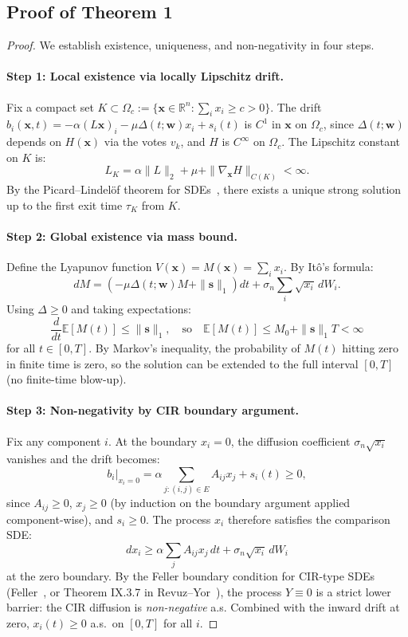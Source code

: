\documentclass[review,12pt]{elsarticle}
\newcommand{\R}{\mathbb{R}}
\newcommand{\bfx}{\mathbf{x}}
\newcommand{\bfw}{\mathbf{w}}
\begin{document}
\subsection{Proof of Theorem 1}

\begin{proof}
We establish existence, uniqueness, and non-negativity in four steps.

\paragraph{Step 1: Local existence via locally Lipschitz drift.}
Fix a compact set $K \subset \Omega_c := \{\bfx \in \R^n : \sum_i x_i \geq c > 0\}$.
The drift $b_i(\bfx, t) = -\alpha(L\bfx)_i - \mu\Delta(t;\bfw)x_i + s_i(t)$
is $C^1$ in $\bfx$ on $\Omega_c$, since $\Delta(t;\bfw)$ depends on
$H(\bfx)$ via the votes $v_k$, and $H$ is $C^\infty$ on $\Omega_c$.
The Lipschitz constant on $K$ is:
\[
  L_K = \alpha\|L\|_2 + \mu + \|\nabla_{\bfx} H\|_{C(K)} < \infty.
\]
By the Picard--Lindel\"{o}f theorem for SDEs~\cite{oksendal2003stochastic},
there exists a unique strong solution up to the first exit time $\tau_K$
from $K$.

\paragraph{Step 2: Global existence via mass bound.}
Define the Lyapunov function $V(\bfx) = M(\bfx) = \sum_i x_i$.
By It\^{o}'s formula:
\[
  dM = \left(-\mu\Delta(t;\bfw)M + \|\mathbf{s}\|_1\right)dt
       + \sigma_n \sum_i \sqrt{x_i}\,dW_i.
\]
Using $\Delta \geq 0$ and taking expectations:
\[
  \frac{d}{dt}\mathbb{E}[M(t)] \leq \|\mathbf{s}\|_1,
  \quad\text{so}\quad
  \mathbb{E}[M(t)] \leq M_0 + \|\mathbf{s}\|_1 T < \infty
\]
for all $t \in [0,T]$.  By Markov's inequality, the probability of
$M(t)$ hitting zero in finite time is zero, so the solution can be
extended to the full interval $[0,T]$ (no finite-time blow-up).

\paragraph{Step 3: Non-negativity by CIR boundary argument.}
Fix any component $i$.  At the boundary $x_i = 0$, the diffusion
coefficient $\sigma_n\sqrt{x_i}$ vanishes and the drift becomes:
\[
  b_i\!\big|_{x_i = 0} = \alpha \sum_{j: (i,j) \in E} A_{ij} x_j + s_i(t) \geq 0,
\]
since $A_{ij} \geq 0$, $x_j \geq 0$ (by induction on the boundary
argument applied component-wise), and $s_i \geq 0$.
The process $x_i$ therefore satisfies the comparison SDE:
\[
  dx_i \geq \alpha\sum_j A_{ij}x_j\,dt + \sigma_n\sqrt{x_i}\,dW_i
\]
at the zero boundary.  By the Feller boundary condition for
CIR-type SDEs (Feller~\cite{feller1951two}, or Theorem IX.3.7 in
Revuz--Yor~\cite{revuzyor1999}), the process $Y \equiv 0$ is a strict
lower barrier: the CIR diffusion is \emph{non-negative} a.s.
Combined with the inward drift at zero, $x_i(t) \geq 0$ a.s.\ on $[0,T]$
for all $i$.


\end{proof}
\end{document}
